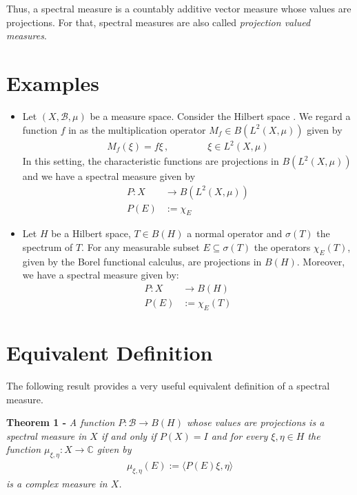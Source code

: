 \documentclass[12pt]{article}
\begin{document}
Thus, a spectral measure is a countably additive vector measure whose values are projections. For that, spectral measures are also called \emph{projection valued measures}.

\section{Examples}

\begin{itemize}
\item Let $(X, \mathcal{B}, \mu)$ be a measure space. Consider the Hilbert space . We regard a function $f$ in  as the multiplication operator $M_f \in B(L^2(X,\mu))$ given by
\begin{align*}
M_f (\xi) = f\xi\,, \qquad\qquad \xi \in L^2(X, \mu)
\end{align*}
In this setting, the characteristic functions are projections in $B(L^2(X, \mu))$ and we have a spectral measure given by
\begin{align*}
P:X & \longrightarrow  B(L^2(X, \mu)) \\
P(E) & :=  \chi_E
\end{align*}
\item Let $H$ be a Hilbert space, $T \in B(H)$ a normal operator and $\sigma(T)$ the spectrum of $T$. For any measurable subset $E \subseteq \sigma(T)$ the operators $\chi_E (T)$, given by the Borel functional calculus, are projections in $B(H)$. Moreover, we have a spectral measure given by:
\begin{align*}
P:X & \longrightarrow  B(H) \\
P(E) & :=  \chi_E(T)
\end{align*}
\end{itemize}

\section{Equivalent Definition}

The following result provides a very useful equivalent definition of a spectral measure.

{\bf Theorem 1 -} \emph{A function $P: \mathcal{B} \longrightarrow B(H)$ whose values are projections is a spectral measure in $X$ if and only if $P(X) = I$ and for every $\xi, \eta \in H$ the function $\mu_{\xi, \eta}: X \longrightarrow \mathbb{C}$ given by}
\begin{align*}
\mu_{\xi, \eta}(E) := \langle P(E)\xi, \eta \rangle
\end{align*}
\emph{is a complex measure in $X$.}
\end{document}
